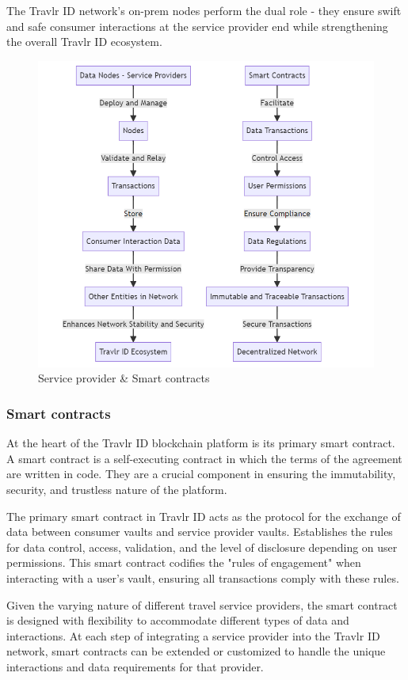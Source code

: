 \documentclass{article}
\begin{document}
The Travlr ID network's on-prem nodes perform the dual role - they ensure swift and safe consumer interactions at the service provider end while strengthening the overall Travlr ID ecosystem.


\begin{figure}[h]
    \centering
    \includegraphics[width=0.6\linewidth]{travlr_diagram_6.png}
    \caption{Service provider \& Smart contracts}
    \label{fig:enter-label}
\end{figure}


\subsubsection{Smart contracts}

At the heart of the Travlr ID blockchain platform is its primary smart contract. A smart contract is a self-executing contract in which the terms of the agreement are written in code. They are a crucial component in ensuring the immutability, security, and trustless nature of the platform.

The primary smart contract in Travlr ID acts as the protocol for the exchange of data between consumer vaults and service provider vaults. Establishes the rules for data control, access, validation, and the level of disclosure depending on user permissions. This smart contract codifies the "rules of engagement" when interacting with a user's vault, ensuring all transactions comply with these rules.

Given the varying nature of different travel service providers, the smart contract is designed with flexibility to accommodate different types of data and interactions. At each step of integrating a service provider into the Travlr ID network, smart contracts can be extended or customized to handle the unique interactions and data requirements for that provider.
\end{document}
